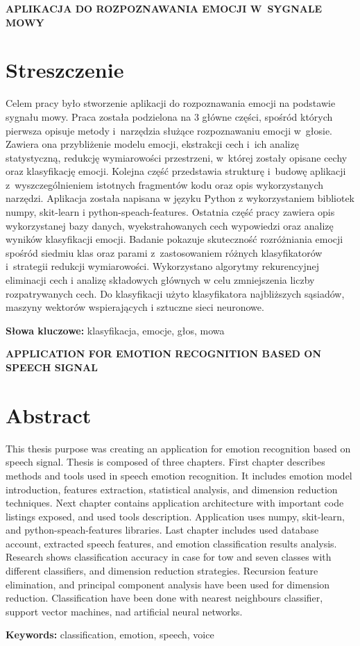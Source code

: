 \newpage
\begin{center}
\large \bf
APLIKACJA DO ROZPOZNAWANIA EMOCJI W~SYGNALE MOWY
\end{center}

\section*{Streszczenie}
Celem pracy było stworzenie aplikacji do rozpoznawania emocji na podstawie sygnału mowy.
Praca została podzielona na 3 główne części, spośród których pierwsza opisuje metody i~narzędzia służące rozpoznawaniu emocji w~głosie.
Zawiera ona przybliżenie modelu emocji, ekstrakcji cech i~ich analizę statystyczną, redukcję wymiarowości przestrzeni, w~której zostały opisane cechy oraz klasyfikację emocji.
Kolejna część przedstawia strukturę i~budowę aplikacji z~wyszczególnieniem istotnych fragmentów kodu
oraz opis wykorzystanych narzędzi.
Aplikacja została napisana w języku Python z wykorzystaniem bibliotek numpy, skit-learn i python-speach-features.
Ostatnia część pracy zawiera opis wykorzystanej bazy danych, wyekstrahowanych cech wypowiedzi oraz analizę wyników klasyfikacji emocji.
Badanie pokazuje skuteczność rozróżniania emocji spośród siedmiu klas oraz parami z~zastosowaniem różnych klasyfikatorów i~strategii redukcji wymiarowości.
Wykorzystano algorytmy rekurencyjnej eliminacji cech i analizę składowych głównych w celu zmniejszenia liczby rozpatrywanych cech.
Do klasyfikacji użyto klasyfikatora najbliższych sąsiadów, maszyny wektorów wspierających i sztuczne sieci neuronowe.

\bigskip
{\noindent\bf Słowa kluczowe:} klasyfikacja, emocje, głos, mowa

\newpage

\begin{center}
\large \bf
APPLICATION FOR EMOTION RECOGNITION BASED ON SPEECH SIGNAL
\end{center}

\section*{Abstract}
This thesis purpose was creating an application for emotion recognition based on speech signal.
Thesis is composed of three chapters.
First chapter describes methods and tools used in speech emotion recognition.
It includes emotion model introduction, features extraction, statistical analysis, and dimension reduction techniques.
Next chapter contains application architecture with important code listings exposed, and used tools description.
Application uses numpy, skit-learn, and python-speach-features libraries.
Last chapter includes used database account, extracted speech features, and emotion classification results analysis.
Research shows classification accuracy in case for tow and seven classes with different classifiers, and dimension reduction strategies.
Recursion feature elimination, and principal component analysis have been used for dimension reduction.
Classification have been done with nearest neighbours classifier, support vector machines, nad artificial neural networks. 

\bigskip
{\noindent\bf Keywords:} classification, emotion, speech, voice

\vfill
